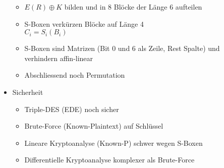 \documentclass[11pt, paper=a4, twocolumn]{scrartcl}
\begin{document}
\begin{itemize}
\begin{itemize}
					\item $E(R)\oplus K$ bilden und in 8 Blöcke der Länge 6 aufteilen
					\item S-Boxen verkürzen Blöcke auf Länge 4\\
						$C_i=S_i(B_i)$
					\item S-Boxen sind Matrizen (Bit 0 und 6 als Zeile, Rest Spalte) und verhindern affin-linear
					\item Abschliessend noch Permutation
				\end{itemize}
			\item Sicherheit
				\begin{itemize}
					\item Triple-DES (EDE) noch sicher
					\item Brute-Force (Known-Plaintext) auf Schlüssel
					\item Lineare Kryptoanalyse (Known-P) schwer wegen S-Boxen
					\item Differentielle Kryptoanalyse komplexer als Brute-Force
				\end{itemize}
		\end{itemize}
	
\end{document}
